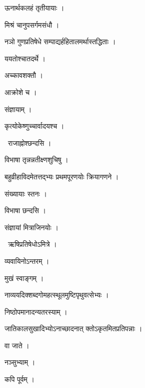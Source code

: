 \documentclass[10pt, openany, oneside]{book}
\begin{document}
\noindent ऊनार्थकलहं तृतीयायाः ।

\noindent मिश्रं चानुपसर्गमसंधौ ।

\noindent नञो गुणप्रतिषेधे सम्पाद्यर्हहितालमर्थास्तद्धिताः ।

\noindent ययतोश्चातदर्थे ।

\noindent अच्कावशक्तौ ।

\noindent आक्रोशे च ।

\noindent संज्ञायाम् ।

\noindent कृत्योकेष्णुच्चार्वादयश्च ।

\par\noindent\hspace{1.5em}{\vps वा॰}~{\qt राजाह्नोश्छन्दसि ।}

\noindent विभाषा तृन्नन्नतीक्ष्णशुचिषु ।

\noindent बहुव्रीहाविदमेतत्तद्भ्यः प्रथमपूरणयोः क्रियागणने ।

\noindent संख्यायाः स्तनः ।

\noindent विभाषा छन्दसि ।

\noindent संज्ञायां मित्राजिनयोः ।

\par\noindent\hspace{1.5em}{\vps वा॰}~{\qt ऋषिप्रतिषेधोऽमित्रे ।}

\noindent व्यवायिनोऽन्तरम् ।

\noindent मुखं स्वाङ्गम् ।

\noindent नाव्ययदिक्शब्दगोमहत्स्थूलमुष्टिपृथुवत्सेभ्यः ।

\noindent निष्ठोपमानादन्यतरस्याम् ।

\noindent जातिकालसुखादिभ्योऽनाच्छादनात् क्तोऽकृतमितप्रतिपन्नाः ।

\noindent वा जाते ।

\noindent नञ्सुभ्याम् ।

\noindent कपि पूर्वम् ।
\end{document}
